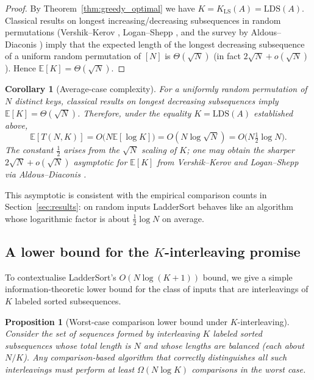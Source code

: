 \documentclass[12pt,a4paper]{article}
\theoremstyle{plain}
\newtheorem{proposition}[theorem]{Proposition}
\newtheorem{corollary}[theorem]{Corollary}
\theoremstyle{definition}
\begin{document}
\begin{proof}
By Theorem~\ref{thm:greedy_optimal} we have $K=K_{\mathrm{LS}}(A)=\mathrm{LDS}(A)$.
Classical results on longest increasing/decreasing subsequences in random
permutations (Vershik--Kerov \cite{VershikKerov1977},
Logan--Shepp \cite{LoganShepp1977}, and the survey by
Aldous--Diaconis \cite{AldousDiaconis1999}) imply that the expected length
of the longest decreasing subsequence of a uniform random permutation of
$[N]$ is $\Theta(\sqrt{N})$ (in fact $2\sqrt{N}+o(\sqrt{N})$).  Hence
$\mathbb{E}[K]=\Theta(\sqrt{N})$.
\end{proof}

\begin{corollary}[Average-case complexity]
\label{cor:avgcase}
For a uniformly random permutation of $N$ distinct keys, classical results
on longest decreasing subsequences imply $\mathbb{E}[K]=\Theta(\sqrt{N})$.
Therefore, under the equality $K=\mathrm{LDS}(A)$ established above,
\[ \mathbb{E}[T(N,K)] = O\bigl(N\mathbb{E}[\log K]\bigr) = O(N\log\sqrt{N}) = O\bigl(N\tfrac{1}{2}\log N\bigr).
\]
The constant $\tfrac{1}{2}$ arises from the $\sqrt{N}$ scaling of $K$; one
may obtain the sharper $2\sqrt{N}+o(\sqrt{N})$ asymptotic for $\mathbb{E}[K]$
from Vershik--Kerov and Logan--Shepp via Aldous--Diaconis \cite{VershikKerov1977,LoganShepp1977,AldousDiaconis1999}.
\end{corollary}


This asymptotic is consistent with the empirical comparison counts in
Section~\ref{sec:results}: on random inputs LadderSort behaves like an
algorithm whose logarithmic factor is about $\tfrac{1}{2}\log N$ on average.

\subsection{A lower bound for the $K$-interleaving promise}
\label{sec:lowerbound}

To contextualise LadderSort's $O(N\log(K+1))$ bound, we give a simple
information-theoretic lower bound for the class of inputs that are
interleavings of $K$ labeled sorted subsequences.

\begin{proposition}[Worst-case comparison lower bound under $K$-interleaving]
\label{prop:lowerbound}
Consider the set of sequences formed by interleaving $K$ labeled sorted
subsequences whose total length is $N$ and whose lengths are balanced
(each about $N/K$).  Any comparison-based algorithm that correctly
distinguishes all such interleavings must perform at least
\(\Omega(N\log K)\) comparisons in the worst case.
\end{proposition}
\end{document}
